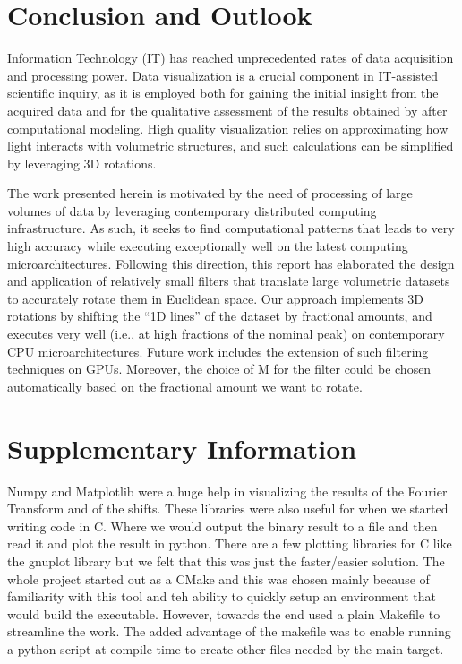 \documentclass[]{usiinfbachelorproject}
\begin{document}
		
		\section{Conclusion and Outlook}
		Information Technology (IT) has reached unprecedented rates of data acquisition and processing power. Data visualization is a crucial component in IT-assisted scientific inquiry, as it is employed both for gaining the initial insight from the acquired data and for the qualitative assessment of the results obtained by after computational modeling. High quality visualization relies on approximating how light interacts with volumetric structures, and such calculations can be simplified by leveraging 3D rotations. 
		
		The work presented herein is motivated by the need of processing of large volumes of data by leveraging contemporary distributed computing infrastructure. As such, it seeks to find computational patterns that leads to very high accuracy while executing exceptionally well on the latest computing microarchitectures.
		Following this direction, this report has elaborated the design and application of relatively small filters that translate large volumetric datasets to accurately rotate them in Euclidean space. Our approach implements 3D rotations by shifting the ``1D lines'' of the dataset by fractional amounts, and executes very well (i.e., at high fractions of the nominal peak) on contemporary CPU microarchitectures. Future work includes the extension of such filtering techniques on GPUs. Moreover, the choice of M for the filter could be chosen automatically based on the fractional amount we want to rotate.
		\newpage
		
		
		
		\section* {Supplementary Information}
		Numpy and Matplotlib were a huge help in visualizing the results of the Fourier Transform and of the shifts. These libraries were also useful for when we started writing code in C. Where we would output the binary result to a file and then read it and plot the result in python. There are a few plotting libraries for C like the gnuplot library but we felt that this was just the faster/easier solution.
		The whole project started out as a CMake and this was chosen mainly because of familiarity with this tool and teh ability to quickly setup an environment that would build the executable. However, towards the end used a plain Makefile to streamline the work. The added advantage of the makefile was to enable running a python script at compile time to create other files needed by the main target. 
		
\end{document}

